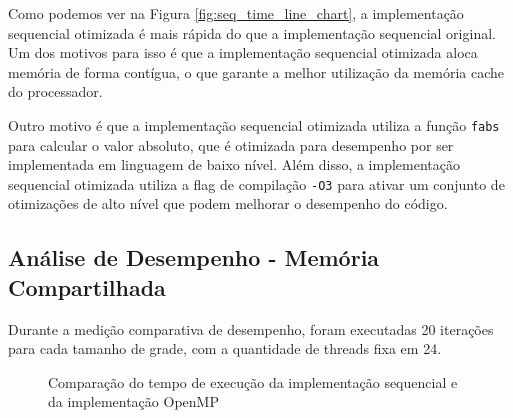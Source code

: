 \documentclass[conference]{IEEEtran}
\begin{document}
Como podemos ver na Figura \ref{fig:seq_time_line_chart}, a implementação sequencial otimizada é mais rápida do que a implementação sequencial original. Um dos motivos para isso é que a implementação sequencial otimizada aloca memória de forma contígua, o que garante a melhor utilização da memória cache do processador.

Outro motivo é que a implementação sequencial otimizada utiliza a função \texttt{fabs} para calcular o valor absoluto, que é otimizada para desempenho por ser implementada em linguagem de baixo nível. Além disso, a implementação sequencial otimizada utiliza a flag de compilação \texttt{-O3} para ativar um conjunto de otimizações de alto nível que podem melhorar o desempenho do código.

\subsection{Análise de Desempenho - Memória Compartilhada}

Durante a medição comparativa de desempenho, foram executadas 20 iterações para cada tamanho de grade, com a quantidade de threads fixa em 24.

\begin{figure}[H]
    \centering
    \caption{Comparação do tempo de execução da implementação sequencial e da implementação OpenMP}
    \label{fig:seq_omp_time_line_chart}
\end{figure}
\end{document}
